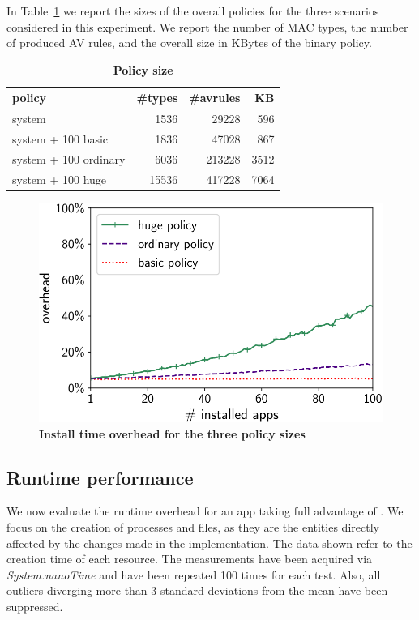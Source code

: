 In Table~\ref{tab:seapp_policy} we report the sizes of the overall
policies for the three scenarios considered in this experiment.  We
report the number of MAC types, the number of produced AV rules, and
the overall size in KBytes of the binary policy.
%
\begin{table}[h!]
	\centering
        \small
	\begin{tabular}{|l|r|r|r|}
		\hline
		\textbf{policy} & \textbf{\#types} & \textbf{\#avrules} & \textbf{KB} \\ \hline
		system & 1536 & 29228 &  596 \\ \hline
		system + 100 basic & 1836 & 47028 &  867 \\ \hline
		system + 100 ordinary & 6036 & 213228 &  3512 \\ \hline
		system + 100 huge & 15536 & 417228 &  7064 \\ \hline
	\end{tabular}
	\caption{\bf Policy size}
	\label{tab:seapp_policy}
\end{table}
%
\begin{figure}[t]
	\centering
	\includegraphics[width=0.7\columnwidth]{chapters/seapp/data/overheads}
	\caption{\label{fig:seapp_install_time} \bf Install time overhead for the three policy sizes}
\end{figure}


\subsection{Runtime performance}

We now evaluate the runtime overhead for an app taking full advantage
of \pap.  We focus on the creation of processes and files, as they are
the entities directly affected by the changes made in the
implementation.  The data shown refer to the creation time of each
resource.  The measurements have been acquired via
\textit{System.nanoTime} and have been repeated 100 times for each
test.  Also, all outliers diverging more than 3 standard deviations
from the mean have been suppressed.


